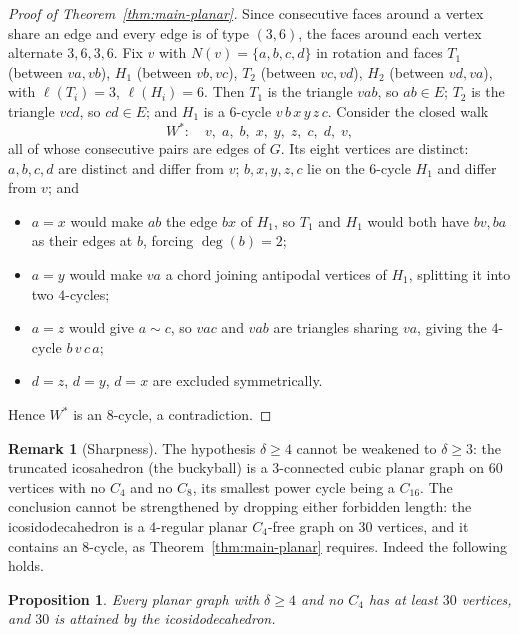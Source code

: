 \documentclass[11pt]{article}
\theoremstyle{plain}
\newtheorem{proposition}[theorem]{Proposition}
\theoremstyle{definition}
\newtheorem{remark}[theorem]{Remark}
\newcommand{\Cfour}{C_4}
\newcommand{\Ceight}{C_8}
\newcommand{\Csixteen}{C_{16}}
\begin{document}
\begin{proof}[Proof of Theorem~\ref{thm:main-planar}]
Since consecutive faces around a vertex share an edge and every edge is of type
$(3,6)$, the faces around each vertex alternate $3,6,3,6$. Fix $v$ with
$N(v)=\{a,b,c,d\}$ in rotation and faces $T_1$ (between $va,vb$), $H_1$ (between
$vb,vc$), $T_2$ (between $vc,vd$), $H_2$ (between $vd,va$), with
$\ell(T_i)=3$, $\ell(H_i)=6$. Then $T_1$ is the triangle $vab$, so $ab\in E$;
$T_2$ is the triangle $vcd$, so $cd\in E$; and $H_1$ is a $6$-cycle
$v\,b\,x\,y\,z\,c$. Consider the closed walk
\[
  W^{*}:\quad v,\;a,\;b,\;x,\;y,\;z,\;c,\;d,\;v,
\]
all of whose consecutive pairs are edges of $G$. Its eight vertices are
distinct: $a,b,c,d$ are distinct and differ from $v$; $b,x,y,z,c$ lie on the
$6$-cycle $H_1$ and differ from $v$; and
\begin{itemize}
\item $a=x$ would make $ab$ the edge $bx$ of $H_1$, so $T_1$ and $H_1$ would both
have $bv,ba$ as their edges at $b$, forcing $\deg(b)=2$;
\item $a=y$ would make $va$ a chord joining antipodal vertices of $H_1$,
splitting it into two $4$-cycles;
\item $a=z$ would give $a\sim c$, so $vac$ and $vab$ are triangles sharing $va$,
giving the $4$-cycle $b\,v\,c\,a$;
\item $d=z$, $d=y$, $d=x$ are excluded symmetrically.
\end{itemize}
Hence $W^{*}$ is an $8$-cycle, a contradiction.
\end{proof}

\begin{remark}[Sharpness]
The hypothesis $\delta\ge4$ cannot be weakened to $\delta\ge3$: the truncated
icosahedron (the buckyball) is a $3$-connected cubic planar graph on $60$
vertices with no $\Cfour$ and no $\Ceight$, its smallest power cycle being a
$\Csixteen$. The conclusion cannot be strengthened by dropping either forbidden
length: the icosidodecahedron is a $4$-regular planar $\Cfour$-free graph on
$30$ vertices, and it contains an $8$-cycle, as Theorem~\ref{thm:main-planar}
requires. Indeed the following holds.
\end{remark}

\begin{proposition}
Every planar graph with $\delta\ge4$ and no $\Cfour$ has at least $30$ vertices,
and $30$ is attained by the icosidodecahedron.
\end{proposition}
\end{document}
